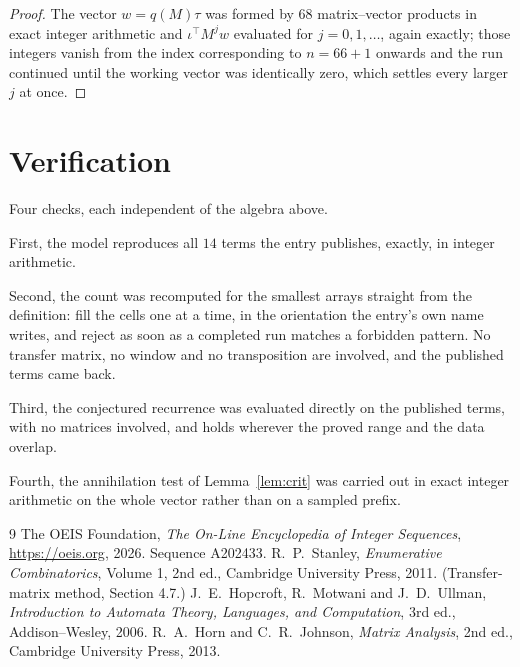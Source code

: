 \documentclass[11pt,a4paper]{article}
\theoremstyle{plain}
\theoremstyle{definition}
\begin{document}
\begin{proof}
The vector $w=q(M)\tau$ was formed by $68$ matrix--vector products in exact integer
arithmetic and $\iota^{\!\top}M^{j}w$ evaluated for $j=0,1,\dots$, again exactly; those
integers vanish from the index corresponding to $n=66+1$ onwards and the run continued
until the working vector was identically zero, which settles every larger $j$ at once.
\end{proof}

\section{Verification}

Four checks, each independent of the algebra above.

First, the model reproduces all $14$ terms the entry publishes, exactly, in integer
arithmetic.

Second, the count was recomputed for the smallest arrays straight from the definition: fill the
cells one at a time, in the orientation the entry's own name writes, and reject as soon as a
completed run matches a forbidden pattern. No transfer matrix, no window and no transposition
are involved, and the published terms came back.

Third, the conjectured recurrence was evaluated directly on the published terms, with no
matrices involved, and holds wherever the proved range and the data overlap.

Fourth, the annihilation test of Lemma~\ref{lem:crit} was carried out in exact integer
arithmetic on the whole vector rather than on a sampled prefix.

\begin{thebibliography}{9}
 The OEIS Foundation, \emph{The On-Line Encyclopedia of Integer
Sequences}, \url{https://oeis.org}, 2026. Sequence A202433.
 R.~P.~Stanley, \emph{Enumerative Combinatorics}, Volume 1, 2nd ed.,
Cambridge University Press, 2011. (Transfer-matrix method, Section 4.7.)
 J.~E.~Hopcroft, R.~Motwani and J.~D.~Ullman, \emph{Introduction to Automata
Theory, Languages, and Computation}, 3rd ed., Addison--Wesley, 2006.
 R.~A.~Horn and C.~R.~Johnson, \emph{Matrix Analysis}, 2nd ed., Cambridge
University Press, 2013.
\end{thebibliography}
\end{document}
